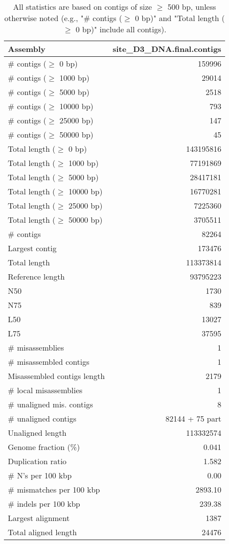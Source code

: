 \documentclass[12pt,a4paper]{article}
\begin{document}
\begin{table}[ht]
\begin{center}
\caption{All statistics are based on contigs of size $\geq$ 500 bp, unless otherwise noted (e.g., "\# contigs ($\geq$ 0 bp)" and "Total length ($\geq$ 0 bp)" include all contigs).}
\begin{tabular}{|l*{1}{|r}|}
\hline
Assembly & site\_D3\_DNA.final.contigs \\ \hline
\# contigs ($\geq$ 0 bp) & 159996 \\ \hline
\# contigs ($\geq$ 1000 bp) & 29014 \\ \hline
\# contigs ($\geq$ 5000 bp) & 2518 \\ \hline
\# contigs ($\geq$ 10000 bp) & 793 \\ \hline
\# contigs ($\geq$ 25000 bp) & 147 \\ \hline
\# contigs ($\geq$ 50000 bp) & 45 \\ \hline
Total length ($\geq$ 0 bp) & 143195816 \\ \hline
Total length ($\geq$ 1000 bp) & 77191869 \\ \hline
Total length ($\geq$ 5000 bp) & 28417181 \\ \hline
Total length ($\geq$ 10000 bp) & 16770281 \\ \hline
Total length ($\geq$ 25000 bp) & 7225360 \\ \hline
Total length ($\geq$ 50000 bp) & 3705511 \\ \hline
\# contigs & 82264 \\ \hline
Largest contig & 173476 \\ \hline
Total length & 113373814 \\ \hline
Reference length & 93795223 \\ \hline
N50 & 1730 \\ \hline
N75 & 839 \\ \hline
L50 & 13027 \\ \hline
L75 & 37595 \\ \hline
\# misassemblies & 1 \\ \hline
\# misassembled contigs & 1 \\ \hline
Misassembled contigs length & 2179 \\ \hline
\# local misassemblies & 1 \\ \hline
\# unaligned mis. contigs & 8 \\ \hline
\# unaligned contigs & 82144 + 75 part \\ \hline
Unaligned length & 113332574 \\ \hline
Genome fraction (\%) & 0.041 \\ \hline
Duplication ratio & 1.582 \\ \hline
\# N's per 100 kbp & 0.00 \\ \hline
\# mismatches per 100 kbp & 2893.10 \\ \hline
\# indels per 100 kbp & 239.38 \\ \hline
Largest alignment & 1387 \\ \hline
Total aligned length & 24476 \\ \hline
\end{tabular}
\end{center}
\end{table}
\end{document}
